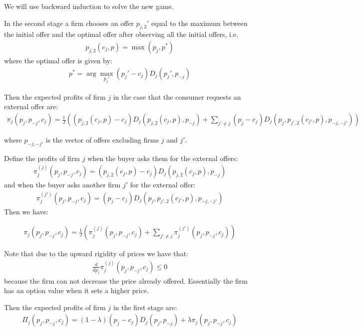 \documentclass[12pt]{article}
\begin{document}
We will use backward induction to solve the new game. 

In the second stage a firm chooses an offer $p_{j,2}'$ equal to the maximum between the initial offer and the optimal offer after observing all the initial offers, i.e. 
\begin{align}
\label{eq:base_equilibrium2}
    p_{j,2}(c_j, p) = \max(p_j, p^*)
\end{align}
where the optimal offer is given by: 
\begin{align}
    p^* = \arg \max_{p_j'} (p_j' - c_j) D_j(p_j', p_{-j}) 
\end{align}

Then the expected profits of firm $j$ in the case that the consumer requests an external offer are: 
\begin{align}\label{eq:profits_external}
    \pi_j(p_j, p_{-j}, c_j) =  \frac{1}{J} \left( (p_{j,2}(c_j, p) - c_j) D_j(p_{j,2}(c_j, p), p_{-j}) + \sum_{j'\neq j} (p_j - c_j) D_j(p_j, p_{j',2}(c_{j'}, p), p_{-j, -j'}) \right)
\end{align}

where $p_{-j, -j'}$ is the vector of offers excluding firms $j$ and $j'$.

Define the profits of firm $j$ when the buyer asks them for the external offers: 
\begin{align}
    \pi_j^{(j)}(p_j, p_{-j}, c_j) =  (p_{j,2}(c_j, p) - c_j) D_j(p_{j,2}(c_j, p), p_{-j})
\end{align}
and when the buyer asks another firm $j'$ for the external offer:
\begin{align}
    \pi_j^{(j')}(p_j, p_{-j}, c_j) =  (p_j - c_j) D_j(p_j, p_{j',2}(c_{j'}, p), p_{-j, -j'})
\end{align}
Then we have: 


\begin{align}\label{eq:profits_external2}
    \pi_j(p_j, p_{-j}, c_j) =  \frac{1}{J} \left( \pi_j^{(j)}(p_j, p_{-j}, c_j)  + \sum_{j'\neq j} \pi_j^{(j')}(p_j, p_{-j}, c_j) \right)
\end{align}

Note that due to the upward rigidity of prices we have that: 
\begin{align}\label{eq:option_value}
    \frac{d}{d p_j}   \pi_j^{(j)}(p_j, p_{-j}, c_j) \leq 0
\end{align}
because the firm can not decrease the price already offered. Essentially the firm has an option value when it sets a higher price. 

Then the expected profits of firm $j$ in the first stage are: 
\begin{align}
    \Pi_j(p_j, p_{-j}, c_j) = (1-\lambda) (p_j - c_j) D_j(p_j, p_{-j}) + \lambda \pi_j(p_j, p_{-j}, c_j)
\end{align}
\end{document}
